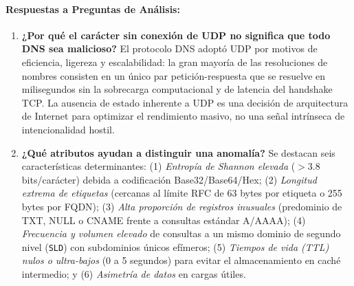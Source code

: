 \documentclass[11pt,letterpaper]{article}
\begin{document}
\paragraph{Respuestas a Preguntas de Análisis:}
\begin{enumerate}
    \item \textbf{¿Por qué el carácter sin conexión de UDP no significa que todo DNS sea malicioso?} El protocolo DNS adoptó UDP por motivos de eficiencia, ligereza y escalabilidad: la gran mayoría de las resoluciones de nombres consisten en un único par petición-respuesta que se resuelve en milisegundos sin la sobrecarga computacional y de latencia del handshake TCP. La ausencia de estado inherente a UDP es una decisión de arquitectura de Internet para optimizar el rendimiento masivo, no una señal intrínseca de intencionalidad hostil.
    \item \textbf{¿Qué atributos ayudan a distinguir una anomalía?} Se destacan seis características determinantes: (1) \textit{Entropía de Shannon elevada} ($>3.8$ bits/carácter) debida a codificación Base32/Base64/Hex; (2) \textit{Longitud extrema de etiquetas} (cercanas al límite RFC de 63 bytes por etiqueta o 255 bytes por FQDN); (3) \textit{Alta proporción de registros inusuales} (predominio de TXT, NULL o CNAME frente a consultas estándar A/AAAA); (4) \textit{Frecuencia y volumen elevado} de consultas a un mismo dominio de segundo nivel (\texttt{SLD}) con subdominios únicos efímeros; (5) \textit{Tiempos de vida (TTL) nulos o ultra-bajos} (0 a 5 segundos) para evitar el almacenamiento en caché intermedio; y (6) \textit{Asimetría de datos} en cargas útiles.
\end{enumerate}
\end{document}
